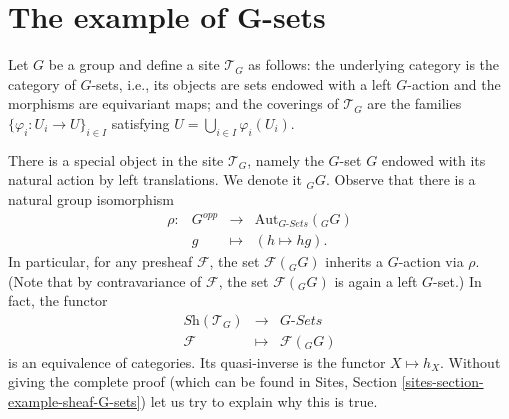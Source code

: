 \section{The example of G-sets}
\label{section-G-sets}

\noindent
Let $G$ be a group and define a site $\mathcal{T}_G$ as follows: the underlying
category is the category of $G$-sets, i.e., its objects are sets endowed
with a left $G$-action and the morphisms are equivariant maps; and the
coverings of $\mathcal{T}_G$ are the families
$\{\varphi_i : U_i \to U\}_{i\in I}$ satisfying
$U = \bigcup_{i\in I} \varphi_i(U_i)$.

\medskip\noindent
There is a special object in the site $\mathcal{T}_G$, namely the $G$-set $G$
endowed with its natural action by left translations. We denote it ${}_G G$.
Observe that there is a natural group isomorphism
$$
\begin{matrix}
\rho: & G^{opp} & \longrightarrow & \text{Aut}_{G\textit{-Sets}}({}_G G) \\
& g & \longmapsto & (h \mapsto hg).
\end{matrix}
$$
In particular, for any presheaf $\mathcal{F}$, the set $\mathcal{F}({}_G G)$
inherits a $G$-action via $\rho$. (Note that by contravariance of
$\mathcal{F}$, the set $\mathcal{F}({}_G G)$ is again a left $G$-set.) In fact,
the functor
$$
\begin{matrix}
\textit{Sh}(\mathcal{T}_G) & \longrightarrow & G\textit{-Sets} \\
\mathcal{F} & \longmapsto & \mathcal{F}({}_G G)
\end{matrix}
$$
is an equivalence of categories. Its quasi-inverse is the functor $X \mapsto
h_X$. Without giving the complete proof (which can be found in
Sites, Section \ref{sites-section-example-sheaf-G-sets})
let us try to explain why this is true.
